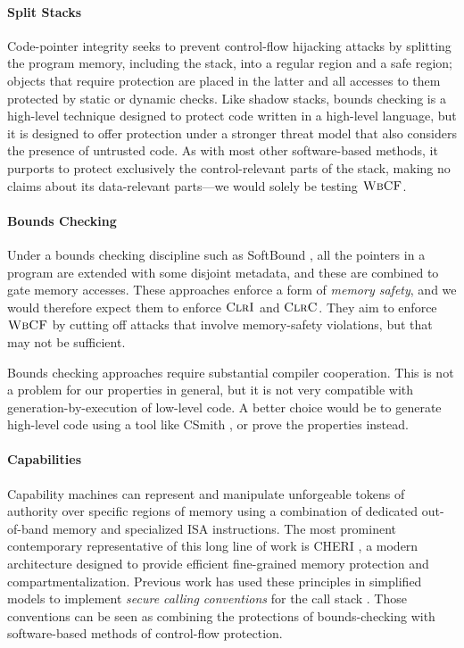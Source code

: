 \documentclass[10pt,conference]{ieeetran}%
\theoremstyle{definition}
\begin{document}
\paragraph{Split Stacks}
%
Code-pointer integrity seeks to prevent control-flow hijacking attacks by
splitting the program memory, including the stack, into a regular region and a
safe region; objects that require protection are placed in the latter and
all accesses to them protected by static or dynamic checks.
%
Like shadow stacks, bounds checking is a high-level technique designed to
protect code written in a high-level language, but it is designed to
offer protection under a stronger threat model that also considers the presence
of untrusted code. As with most other software-based methods, it purports to
protect exclusively the control-relevant parts of the stack, making no claims
about its data-relevant parts---we would solely be testing \(\textnormal{\sc WbCF}\).

\paragraph{Bounds Checking}
%
Under a bounds checking discipline such as SoftBound \cite{NagarakatteZMZ09}, all the pointers
in a program are extended with some disjoint metadata, and these are combined
to gate memory accesses. These approaches enforce a form of \emph{memory safety},
and we would therefore expect them to enforce \(\textnormal{\sc ClrI}\) and \(\textnormal{\sc ClrC}\). They aim
to enforce \(\textnormal{\sc WbCF}\) by cutting off attacks that involve memory-safety violations,
but that may not be sufficient.

Bounds checking approaches require substantial compiler cooperation. This is not a
problem for our properties in general, but it is not very compatible with
generation-by-execution of low-level code. A better choice would be to generate
high-level code using a tool like CSmith \cite{DBLP:conf/pldi/YangCER11}, or prove the properties instead.

\paragraph{Capabilities}

Capability machines can represent and manipulate
unforgeable tokens of authority over specific regions of
memory using a combination of dedicated out-of-band memory and
specialized ISA instructions.
%
The most prominent contemporary representative of this long line of work is
CHERI \cite{DBLP:conf/sp/WatsonWNMACDDGL15}, a modern architecture designed to provide efficient fine-grained
memory protection and compartmentalization.
%
Previous work has used these principles in simplified models to implement
\emph{secure calling conventions} for the call
stack \cite{SkorstengaardLocal,SkorstengaardSTKJFP,Georges22:TempsDesCerises}. Those conventions can be seen as combining the
protections of bounds-checking with software-based methods of control-flow protection.
\end{document}
